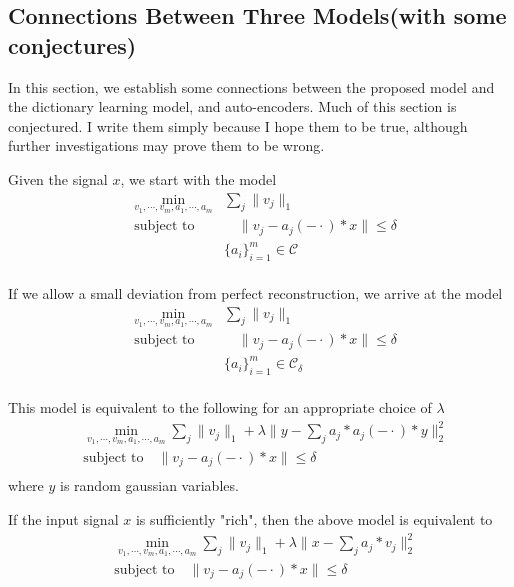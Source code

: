 \documentclass[a4paper]{article}
\begin{document}
{\color{blue}
\subsection{Connections Between Three Models(with some conjectures)}
In this section, we establish some connections between the proposed model and the dictionary learning model, and auto-encoders. Much of this section is conjectured. I write them simply because I hope them to be true, although further investigations may prove them to be wrong. 

Given the signal $x$, we start with the model
\begin{equation}
	\begin{aligned}
		&\min_{v_1,\cdots,v_m,a_1,\cdots,a_m}& \sum_j \|v_j\|_1\\
		&\textrm{subject to} &\quad \|v_j - a_j(-\cdot)*x\|\leq \delta \\
		& &\{a_i\}_{i=1}^m \in \mathcal{C} \\
	\end{aligned}
\end{equation}

If we allow a small deviation from perfect reconstruction, we arrive at the model
\begin{equation}
	\begin{aligned}
		&\min_{v_1,\cdots,v_m,a_1,\cdots,a_m}& \sum_j \|v_j\|_1\\
		&\textrm{subject to} &\quad \|v_j - a_j(-\cdot)*x\|\leq \delta \\
		& &\{a_i\}_{i=1}^m \in \mathcal{C_\delta} \\
	\end{aligned}
\end{equation}

{\color{red} This model is equivalent to the following for an appropriate choice of $\lambda$}
\begin{equation}
	\begin{aligned}
		&\min_{v_1,\cdots,v_m,a_1,\cdots,a_m} \sum_j \|v_j\|_1 + \lambda \|y-\sum_j a_j*a_j(-\cdot)*y\|_2^2\\
		&\textrm{subject to} \quad \|v_j - a_j(-\cdot)*x\|\leq \delta \\
	\end{aligned}
\end{equation}
where $y$ is random gaussian variables.

If the input signal $x$ is sufficiently "rich", then the above model is equivalent to 
\begin{equation}
	\begin{aligned}
		&\min_{v_1,\cdots,v_m,a_1,\cdots,a_m} \sum_j \|v_j\|_1 + \lambda \|x-\sum_j a_j*v_j\|_2^2\\
		&\textrm{subject to} \quad \|v_j - a_j(-\cdot)*x\|\leq \delta \\
	\end{aligned}
\end{equation}

}
\end{document}
